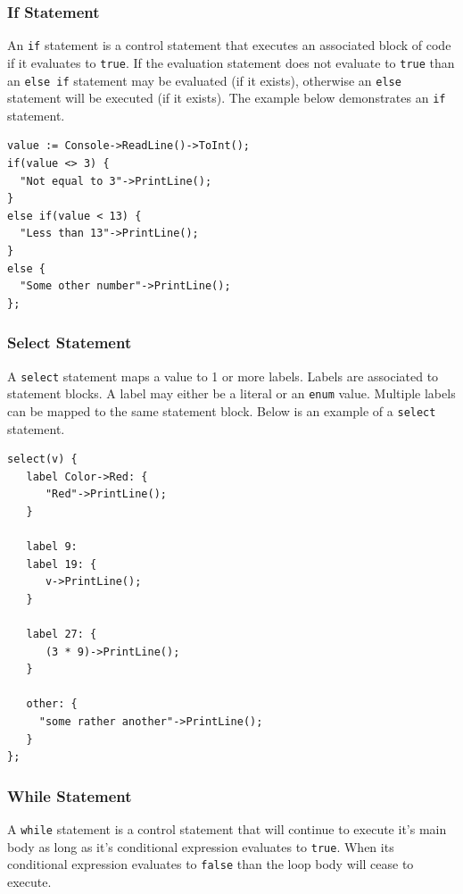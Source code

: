 \documentclass[11pt]{article}
\begin{document}
\subsubsection{If Statement}

An \texttt{if} statement is a control statement that executes an
associated block of code if it evaluates to \texttt{true}.  If the
evaluation statement does not evaluate to \texttt{true} than an
\texttt{else if} statement may be evaluated (if it exists), otherwise
an \texttt{else} statement will be executed (if it exists).  The
example below demonstrates an \texttt{if} statement.

\begin{verbatim}
value := Console->ReadLine()->ToInt();
if(value <> 3) {
  "Not equal to 3"->PrintLine();
}
else if(value < 13) {
  "Less than 13"->PrintLine();
}
else {
  "Some other number"->PrintLine();
};
\end{verbatim}

\subsubsection{Select Statement}

A \texttt{select} statement maps a value to 1 or more labels.  Labels
are associated to statement blocks.  A label may either be a literal
or an \texttt{enum} value.  Multiple labels can be mapped to the same
statement block.  Below is an example of a \texttt{select} statement.

\begin{verbatim}
select(v) {
   label Color->Red: {
      "Red"->PrintLine();
   }

   label 9:
   label 19: {
      v->PrintLine();
   }

   label 27: {
      (3 * 9)->PrintLine();
   }
  
   other: {
     "some rather another"->PrintLine();
   }
};
\end{verbatim}

\subsubsection{While Statement}

A \texttt{while} statement is a control statement that will continue
to execute it's main body as long as it's conditional expression
evaluates to \texttt{true}.  When its conditional expression evaluates
to \texttt{false} than the loop body will cease to execute.
\end{document}
